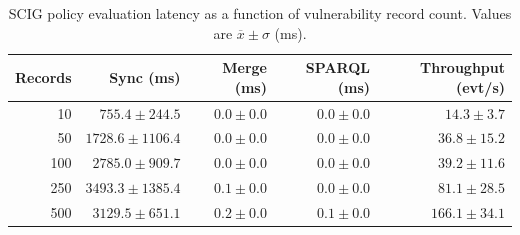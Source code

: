 \begin{table}[htbp]
\centering
\caption{SCIG policy evaluation latency as a function of vulnerability record count. Values are $\overline{x} \pm \sigma$ (ms).}
\label{tab:scig_s4_policy}
\begin{tabular}{rrrrr}
\toprule
\textbf{Records} & \textbf{Sync (ms)} & \textbf{Merge (ms)} & \textbf{SPARQL (ms)} & \textbf{Throughput (evt/s)} \\
\midrule
10 & $755.4 \pm 244.5$ & $0.0 \pm 0.0$ & $0.0 \pm 0.0$ & $14.3 \pm 3.7$ \\
50 & $1728.6 \pm 1106.4$ & $0.0 \pm 0.0$ & $0.0 \pm 0.0$ & $36.8 \pm 15.2$ \\
100 & $2785.0 \pm 909.7$ & $0.0 \pm 0.0$ & $0.0 \pm 0.0$ & $39.2 \pm 11.6$ \\
250 & $3493.3 \pm 1385.4$ & $0.1 \pm 0.0$ & $0.0 \pm 0.0$ & $81.1 \pm 28.5$ \\
500 & $3129.5 \pm 651.1$ & $0.2 \pm 0.0$ & $0.1 \pm 0.0$ & $166.1 \pm 34.1$ \\
\bottomrule
\end{tabular}
\end{table}